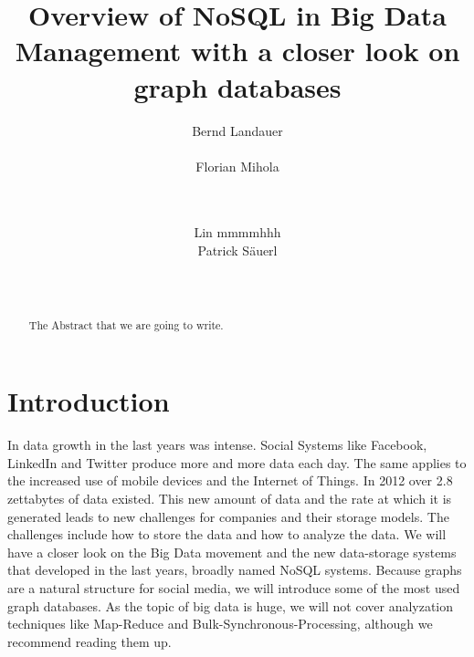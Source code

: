 \documentclass{acm_proc_article-sp}
\begin{document}
\title{Overview of NoSQL in Big Data Management with a closer look on graph databases }

\author{
\alignauthor
Bernd Landauer\\
       \\
\alignauthor 
Florian Mihola\\
	\\
	\\
\and
\alignauthor Lin mmmmhhh
       \\
\alignauthor Patrick S{\"a}uerl\\
       \\
       \\
}


\maketitle
\begin{abstract}
The Abstract that we are going to write.
\end{abstract}

\section{Introduction}

In data growth in the last years was intense. Social Systems like Facebook, LinkedIn and Twitter produce more and more data each day. The same applies to the increased use of mobile devices and the Internet of Things. In 2012 over 2.8 zettabytes of data existed.
This new amount of data and the rate at which it is generated leads to new challenges for companies and their storage models. The challenges include how to store the data and how to analyze the data. We will have a closer look on the Big Data movement and the new data-storage systems that developed in the last years, broadly named NoSQL systems. Because graphs are a natural structure for social media, we will introduce some of the most used graph databases. As the topic of big data is huge, we will not cover analyzation techniques like Map-Reduce and Bulk-Synchronous-Processing, although we recommend reading them up.
\end{document}
